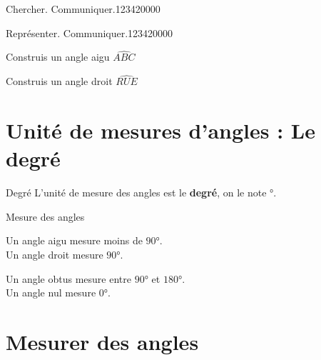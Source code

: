 \begin{pageAD}
\begin{ExoCad}{Chercher. Communiquer.}{1234}{2}{0}{0}{0}{0}
\end{ExoCad}

\begin{ExoCad}{Représenter. Communiquer.}{1234}{2}{0}{0}{0}{0}
 

\begin{minipage}{0.5\linewidth}
Construis un angle aigu $\widehat{ABC}$
\end{minipage}
\begin{minipage}{0.5\linewidth}
Construis un angle droit $\widehat{RUE}$
\end{minipage}

  
\end{ExoCad}

 
\end{pageAD}

\begin{pageCours}
\section{Unité de mesures d'angles : Le degré}

\begin{DefT}{Degré}
L'unité de mesure des angles est le \textbf{degré}, on le note °.
\end{DefT}

 

\begin{DefT}{Mesure des angles}
\begin{minipage}{0.5\linewidth}
 Un angle aigu  mesure moins de $90$°.\\
 Un angle droit  mesure $90$°.

\end{minipage}
\begin{minipage}{0.5\linewidth}
Un angle obtus mesure entre $90$° et $180$°.\\
Un angle nul mesure $0$°.
\end{minipage}
\end{DefT}
 

\section{Mesurer des angles}


\end{pageCours}
